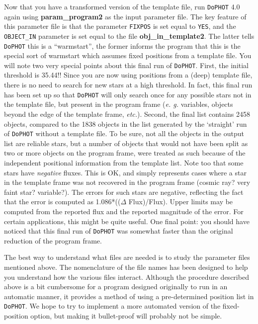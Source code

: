 Now that you have a transformed version of the template file, run 
{\tt DoPHOT} 4.0 again using {\bf param\_program2} as the input parameter
file.  The key feature of this parameter file is that the parameter
{\tt FIXPOS} is set equal to {\tt YES}, and the {\tt OBJECT\_IN}
parameter is set equal to the file {\bf obj\_in\_template2}.  The latter
tells {\tt DoPHOT} this is a ``warmstart'', the former informs the program that
this is the special sort of warmstart which assumes fixed positions from
a template file.   You will note two very special points about this final
run of {\tt DoPHOT}.  First, the initial threshold is 35.44!!  Since you are now
using positions from a (deep) template file, there is no need to search
for new stars at a high threshold. In fact, this final run has been 
set up so that {\tt DoPHOT} will only search once for any possible stars not
in the template file, but present in the program frame ({\it e. g.} 
variables, objects beyond the edge of the template frame, {\it etc.}).
Second, the final list contains 2458 objects, compared to the 1838 objects
in the list generated by the `straight' run of {\tt DoPHOT} without a template
file.    To be sure, not all the objects in the output list are 
reliable stars, but a number of objects that would not have been
split as two or more objects on the program frame, were treated as such 
because of the independent positional information from the template list.
Note too that some stars have {\it negative} fluxes.  This is OK, and 
simply represents cases where a star in the template frame was not 
recovered in the program frame (cosmic ray? very faint star? variable?).
The errors for such stars are negative, reflecting the fact that the error
is computed as 1.086*(($\Delta$ Flux)/Flux).  Upper limits may be computed
from the reported flux and the reported magnitude of the error.
For certain applications, this might be quite useful.
One final point:  you should have noticed that this final run of {\tt DoPHOT}
was somewhat faster than the original reduction of the program frame.

The best way to understand what files are needed is to study the parameter
files mentioned above.  The nomenclature of the file names has been 
designed to help you understand how the various files interact.  Although
the procedure described above is a bit cumbersome for a program designed
originally to run in an automatic manner, it provides a method of 
using a pre-determined position list in {\tt DoPHOT}.  We hope to try to 
implement a more automated version of the fixed-position option, but making
it bullet-proof will probably not be simple.

